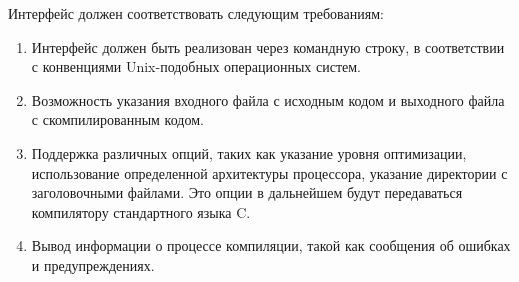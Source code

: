 Интерфейс должен соответствовать следующим требованиям:
\begin{enumerate}
  \item Интерфейс должен быть реализован через командную строку, в соответствии с конвенциями Unix-подобных операционных систем.
  \item Возможность указания входного файла с исходным кодом и выходного файла с скомпилированным кодом.
  \item Поддержка различных опций, таких как указание уровня оптимизации, использование определенной архитектуры процессора, указание директории с заголовочными файлами. Это опции в дальнейшем будут передаваться компилятору стандартного языка C.
  \item Вывод информации о процессе компиляции, такой как сообщения об ошибках и предупреждениях.
\end{enumerate}
